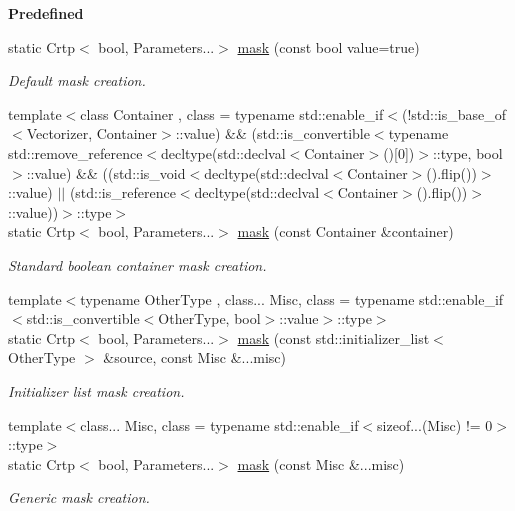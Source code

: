 \begin{Indent}{\bf Predefined}\par
\begin{DoxyCompactItemize}
\item 
static Crtp$<$ bool, Parameters...$>$ \hyperlink{classmagrathea_1_1StaticVectorizer_a5283a8f67f6b68c9bad13f6f25b76df7}{mask} (const bool value=true)
\begin{DoxyCompactList}\small\item\em Default mask creation. \end{DoxyCompactList}\item 
{\footnotesize template$<$class Container , class  = typename std\-::enable\-\_\-if$<$(!std\-::is\-\_\-base\-\_\-of$<$\-Vectorizer, Container$>$\-::value) \&\& (std\-::is\-\_\-convertible$<$typename std\-::remove\-\_\-reference$<$decltype(std\-::declval$<$\-Container$>$()\mbox{[}0\mbox{]})$>$\-::type, bool$>$\-::value) \&\& ((std\-::is\-\_\-void$<$decltype(std\-::declval$<$\-Container$>$().\-flip())$>$\-::value) $|$$|$ (std\-::is\-\_\-reference$<$decltype(std\-::declval$<$\-Container$>$().\-flip())$>$\-::value))$>$\-::type$>$ }\\static Crtp$<$ bool, Parameters...$>$ \hyperlink{classmagrathea_1_1StaticVectorizer_a39a962b3baa77ee6fb4ab2a43f98c8f1}{mask} (const Container \&container)
\begin{DoxyCompactList}\small\item\em Standard boolean container mask creation. \end{DoxyCompactList}\item 
{\footnotesize template$<$typename Other\-Type , class... Misc, class  = typename std\-::enable\-\_\-if$<$std\-::is\-\_\-convertible$<$\-Other\-Type, bool$>$\-::value$>$\-::type$>$ }\\static Crtp$<$ bool, Parameters...$>$ \hyperlink{classmagrathea_1_1StaticVectorizer_a9650665d8e8027a898b46c16940bad2d}{mask} (const std\-::initializer\-\_\-list$<$ Other\-Type $>$ \&source, const Misc \&...misc)
\begin{DoxyCompactList}\small\item\em Initializer list mask creation. \end{DoxyCompactList}\item 
{\footnotesize template$<$class... Misc, class  = typename std\-::enable\-\_\-if$<$sizeof...(\-Misc) != 0$>$\-::type$>$ }\\static Crtp$<$ bool, Parameters...$>$ \hyperlink{classmagrathea_1_1StaticVectorizer_a7c2b9766936bb0f20b743e23aeccf685}{mask} (const Misc \&...misc)
\begin{DoxyCompactList}\small\item\em Generic mask creation. \end{DoxyCompactList}\end{DoxyCompactItemize}
\end{Indent}
